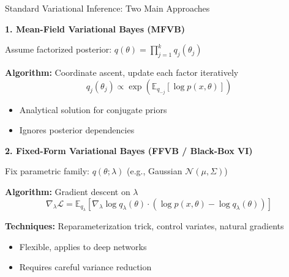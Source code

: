 \documentclass[aspectratio=169, 12pt]{beamer}
\begin{document}
\begin{frame}{Standard Variational Inference: Two Main Approaches}

\textbf{1. Mean-Field Variational Bayes (MFVB)}

Assume factorized posterior: \(q(\theta) = \prod_{j=1}^k q_j(\theta_j)\)

\textbf{Algorithm:} Coordinate ascent, update each factor iteratively
\[
q_j(\theta_j) \propto \exp\left(\mathbb{E}_{q_{-j}}[\log p(x, \theta)]\right)
\]

\begin{itemize}
    \item[\textcolor{green}{$\checkmark$}] Analytical solution for conjugate priors
    \item[\textcolor{red}{$\times$}] Ignores posterior dependencies
\end{itemize}

\vspace{0.3cm}

\textbf{2. Fixed-Form Variational Bayes (FFVB / Black-Box VI)}

Fix parametric family: \(q(\theta; \lambda)\) (e.g., Gaussian \(\mathcal{N}(\mu, \Sigma)\))

\textbf{Algorithm:} Gradient descent on \(\lambda\)
\[
\nabla_\lambda \mathcal{L} = \mathbb{E}_{q_\lambda}[\nabla_\lambda \log q_\lambda(\theta) \cdot (\log p(x, \theta) - \log q_\lambda(\theta))]
\]

\textbf{Techniques:} Reparameterization trick, control variates, natural gradients

\begin{itemize}
    \item[\textcolor{green}{$\checkmark$}] Flexible, applies to deep networks
    \item[\textcolor{red}{$\times$}] Requires careful variance reduction
\end{itemize}

\end{frame}
\end{document}
